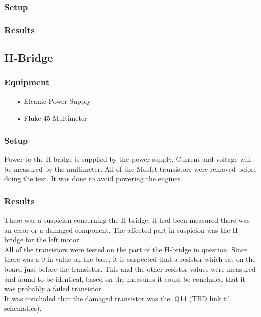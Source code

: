 \subsubsection{Setup}

\subsubsection{Results}

\subsection{H-Bridge}

\subsubsection{Equipment}
\begin{enumerate}
	\item[•]Elcanic Power Supply
	\item[•]Fluke 45 Multimeter
\end{enumerate}

\subsubsection{Setup}
Power to the H-bridge is supplied by the power supply. Current and voltage will be measured by the multimeter.
All of the Mosfet transistors were removed before doing the test. It was done to avoid powering the engines.


\subsubsection{Results}
There was a suspicion concerning the H-bridge, it had been measured there was an error or a damaged component. The affected part in suspicion was the H-bridge for the left motor.\\

All of the transistors were tested on the part of the H-bridge in question.
Since there was a 0 in value on the base, it is suspected that a resistor which sat on the board just before the transistor. This and the other resistor values were measured and found to be identical, based on the measures it could be concluded that it was probably a failed transistor.\\

It was concluded that the damaged transistor was the: Q14 \cite{Q14}  
(TBD link til schematics).\\

